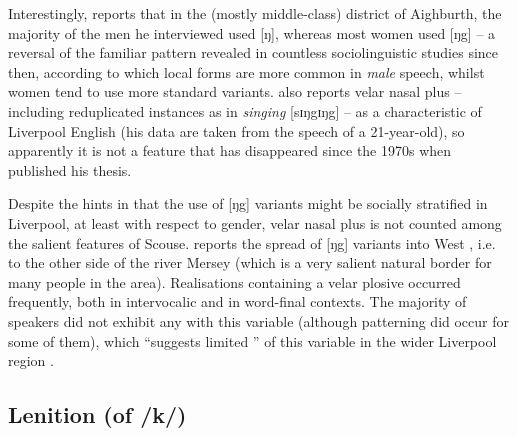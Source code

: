 Interestingly, \citeauthor{knowles1973} reports that in the (mostly middle-class) district of Aighburth, the majority of the men he interviewed used [ŋ], whereas most women used [ŋg] \citeyearpar[cf.][295]{knowles1973} -- a reversal of the familiar pattern revealed in countless sociolinguistic studies since then, according to which local forms are more common in \emph{male} speech, whilst women tend to use more standard variants.
\citet[352]{watson2007} also reports velar nasal plus -- including reduplicated instances as in \emph{singing} [sɪŋgɪŋg] -- as a characteristic of Liverpool English (his data are taken from the speech of a 21-year-old), so apparently it is not a feature that has disappeared since the 1970s when \citeauthor{knowles1973} published his thesis.

Despite the hints in \textcite{knowles1973} that the use of [ŋg] variants might be socially stratified in Liverpool, at least with respect to gender, velar nasal plus is not counted among the salient features of Scouse.
\textcite[98]{newbrook1999} reports the spread of [ŋg] variants into West , i.e. to the other side of the river Mersey (which is a very salient natural border for many people in the area).
Realisations containing a velar plosive occurred frequently, both in intervocalic and in word-final contexts.
The majority of speakers did not exhibit any  with this variable (although  patterning did occur for some of them), which ``suggests limited '' of this variable in the wider Liverpool region \parencite[98]{newbrook1999}.

		\subsection{Lenition (of /k/)}\label{sec.var.con.len}


